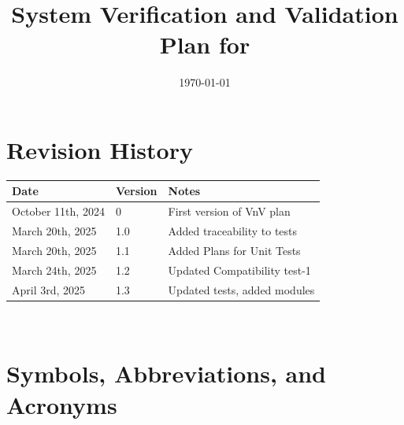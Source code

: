 \documentclass[12pt, titlepage]{article}
\begin{document}
\title{System Verification and Validation Plan for \progname{}} 
\author{\authname}
\date{\today}
	
\maketitle


\section*{Revision History}

\begin{tabularx}{\textwidth}{p{3cm}p{2cm}X}
\toprule {\bf Date} & {\bf Version} & {\bf Notes}\\
\midrule
October 11th, 2024 & 0 & First version of VnV plan\\
March 20th, 2025 & 1.0 & Added traceability to tests\\
March 20th, 2025 & 1.1 & Added Plans for Unit Tests\\
March 24th, 2025 & 1.2 & Updated Compatibility test-1 \\
April 3rd, 2025 & 1.3 & Updated tests, added modules\\
\bottomrule
\end{tabularx}

~\\

\newpage

\tableofcontents

\listoftables


\listoffigures


\newpage

\section{Symbols, Abbreviations, and Acronyms}
\end{document}
